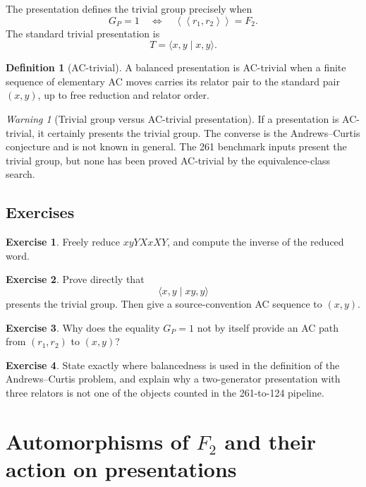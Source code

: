 \documentclass[11pt]{article}
\theoremstyle{definition}
\newtheorem{definition}[theorem]{Definition}
\newtheorem{exercise}{Exercise}[section]
\theoremstyle{remark}
\newtheorem{warning}[theorem]{Warning}
\newcommand{\F}{F_2}
\newcommand{\Ncl}[1]{\left\langle\!\left\langle #1\right\rangle\!\right\rangle}
\begin{document}
The presentation defines the trivial group precisely when
\[
  G_P=1
  \quad\Longleftrightarrow\quad
  \Ncl{r_1,r_2}=\F.
\]
The standard trivial presentation is
\[
  T=\langle x,y\mid x,y\rangle.
\]

\begin{definition}[AC-trivial]
A balanced presentation is AC-trivial when a finite sequence of elementary
AC moves carries its relator pair to the standard pair \((x,y)\), up to
free reduction and relator order.
\end{definition}

\begin{warning}[Trivial group versus AC-trivial presentation]
If a presentation is AC-trivial, it certainly presents the trivial group.
The converse is the Andrews--Curtis conjecture and is not known in general.
The 261 benchmark inputs present the trivial group, but none has been proved
AC-trivial by the equivalence-class search.
\end{warning}

\subsection*{Exercises}

\begin{exercise}
Freely reduce \(xyYXxXY\), and compute the inverse of the reduced word.
\end{exercise}

\begin{exercise}
Prove directly that
\[
  \langle x,y\mid xy,y\rangle
\]
presents the trivial group.  Then give a source-convention AC sequence to
\((x,y)\).
\end{exercise}

\begin{exercise}
Why does the equality \(G_P=1\) not by itself provide an AC path from
\((r_1,r_2)\) to \((x,y)\)?
\end{exercise}

\begin{exercise}
State exactly where balancedness is used in the definition of the
Andrews--Curtis problem, and explain why a two-generator presentation with
three relators is not one of the objects counted in the 261-to-124 pipeline.
\end{exercise}

\section{Automorphisms of \(F_2\) and their action on presentations}
\label{sec:aut}
\end{document}
